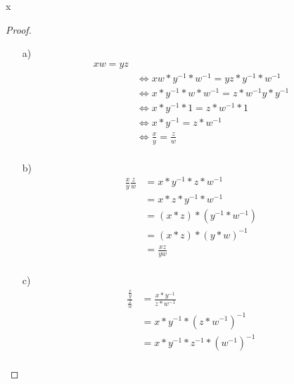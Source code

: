 \documentclass{problemset}
\author{Michael van Straten}
\begin{document}
\maketitle

\begin{problem}{x}
\begin{proof}
    \begin{enumerate}
        \item [a)]
              \begin{align*}
                  xw = yz                                \\
                   & \Leftrightarrow
                  xw*y^{-1}*w^{-1} = yz * y^{-1}*w^{-1}  \\
                   & \Leftrightarrow
                  x*y^{-1}*w*w^{-1} = z*w^{-1} y* y^{-1} \\
                   & \Leftrightarrow
                  x*y^{-1}*1 = z*w^{-1} *1               \\
                   & \Leftrightarrow
                  x*y^{-1} = z*w^{-1}                    \\
                   & \Leftrightarrow
                  \frac{x}{y} = \frac{z}{w}              \\
              \end{align*}
        \item [b)]
              \begin{align*}
                  \frac{x}{y} \frac{z}{w} & = x * y^{-1} * z * w^{-1}     \\
                                          & = x * z * y^{-1} * w^{-1}     \\
                                          & = (x * z) * (y^{-1} * w^{-1}) \\
                                          & = (x * z) * {(y * w)}^{-1}    \\
                                          & = \frac{xz}{yw}               \\
              \end{align*}
        \item [c)]
              \begin{align*}
                  \frac{\frac{x}{y}}{\frac{z}{w}} & = \frac{x*y^{-1}}{z * w^{-1}}         \\
                                                  & = x*y^{-1} * {(z * w^{-1})}^{-1}      \\
                                                  & = x*y^{-1} * z^{-1} * {(w^{-1})}^{-1} \\

\end{align*}
\end{enumerate}
\end{proof}
\end{problem}
\end{document}

